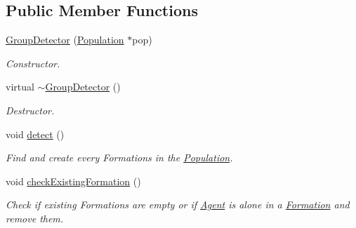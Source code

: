 \subsection*{Public Member Functions}
\begin{DoxyCompactItemize}
\item 
\hyperlink{classGroupDetector_a85c950492809247f6ff0649c5101ce81}{Group\+Detector} (\hyperlink{classPopulation}{Population} $\ast$pop)
\begin{DoxyCompactList}\small\item\em Constructor. \end{DoxyCompactList}\item 
virtual \hyperlink{classGroupDetector_a5b44e047c1f6864e665d917ba7da8a51}{$\sim$\+Group\+Detector} ()
\begin{DoxyCompactList}\small\item\em Destructor. \end{DoxyCompactList}\item 
void \hyperlink{classGroupDetector_a4f97c96bbd5c874e788371dffa074001}{detect} ()\hypertarget{classGroupDetector_a4f97c96bbd5c874e788371dffa074001}{}\label{classGroupDetector_a4f97c96bbd5c874e788371dffa074001}

\begin{DoxyCompactList}\small\item\em Find and create every Formations in the \hyperlink{classPopulation}{Population}. \end{DoxyCompactList}\item 
void \hyperlink{classGroupDetector_a8bee5ba0c6e18594eb810e21ee75bac4}{check\+Existing\+Formation} ()\hypertarget{classGroupDetector_a8bee5ba0c6e18594eb810e21ee75bac4}{}\label{classGroupDetector_a8bee5ba0c6e18594eb810e21ee75bac4}

\begin{DoxyCompactList}\small\item\em Check if existing Formations are empty or if \hyperlink{classAgent}{Agent} is alone in a \hyperlink{classFormation}{Formation} and remove them. \end{DoxyCompactList}\end{DoxyCompactItemize}
